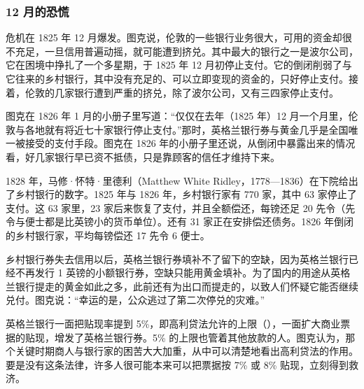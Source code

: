 
\subsubsection{12 月的恐慌}
危机在 1825 年 12 月爆发。图克说，伦敦的一些银行业务很大，可用的资金却很不充足，一旦信用普遍动摇，就可能遭到挤兑。其中最大的银行之一是波尔公司，它在困境中挣扎了一个多星期，于 1825 年 12 月初停止支付\cite{tooke1838v2}。它的倒闭削弱了与它往来的乡村银行，其中没有充足的、可以立即变现的资金的，只好停止支付\cite{tooke1838v2}。接着，伦敦的几家银行遭到严重的挤兑，除了波尔公司，又有三四家停止支付\cite{tooke1838v2}。

图克在 1826 年 1 月的小册子里写道：“仅仅在去年（1825 年）12 月一个月里，伦敦与各地就有将近七十家银行停止支付。”\cite{tooke1838v2}那时，英格兰银行券与黄金几乎是全国唯一被接受的支付手段\cite{tooke1838v2}。图克在 1826 年的小册子里还说，从倒闭中暴露出来的情况看，好几家银行早已资不抵债，只是靠顾客的信任才维持下来\cite{tooke1838v2}。

1828 年，马修·怀特·里德利（Matthew White Ridley，1778—1836）在下院给出了乡村银行的数字。1825 年与 1826 年，乡村银行家有 770 家，其中 63 家停止了支付。这 63 家里，23 家后来恢复了支付，并且全额偿还，每镑还足 20 先令（先令与便士都是比英镑小的货币单位）。还有 31 家正在安排偿还债务。1826 年倒闭的乡村银行家，平均每镑偿还 17 先令 6 便士\cite{tooke1838v2}。

乡村银行券失去信用以后，英格兰银行券填补不了留下的空缺，因为英格兰银行已经不再发行 1 英镑的小额银行券，空缺只能用黄金填补\cite{tooke1838v2}。为了国内的用途从英格兰银行提走的黄金如此之多，此前还有为出口而提走的，以致人们怀疑它能否继续兑付。图克说：“幸运的是，公众逃过了第二次停兑的灾难。”\cite{tooke1838v2}

英格兰银行一面把贴现率提到 5\%，即高利贷法允许的上限（）\cite{boe2017,cannan1919}，一面扩大商业票据的贴现，增发了英格兰银行券\cite{tooke1838v2}。5\% 的上限也管着其他放款的人。图克认为，那个关键时期商人与银行家的困苦大大加重，从中可以清楚地看出高利贷法的作用。要是没有这条法律，许多人很可能本来可以把票据按 7\% 或 8\% 贴现，立刻得到救济\cite{tooke1838v2}。

